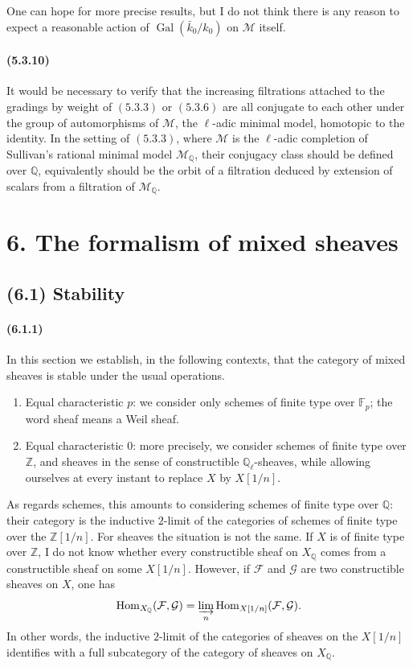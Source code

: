 \documentclass[11pt]{article}
\theoremstyle{remark}
\newcommand{\Ql}{\mathbb{Q}_\ell}
\newcommand{\ZZ}{\mathbb{Z}}
\newcommand{\QQ}{\mathbb{Q}}
\begin{document}
One can hope for more precise results, but I do not think there is any reason to expect a reasonable action of \(\operatorname{Gal}(\bar k_0/k_0)\) on \(\mathcal M\) itself.

\paragraph{(5.3.10)}
It would be necessary to verify that the increasing filtrations attached to the gradings by weight of \((5.3.3)\) or \((5.3.6)\) are all conjugate to each other under the group of automorphisms of \(\mathcal M\), the \(\ell\)-adic minimal model, homotopic to the identity.  In the setting of \((5.3.3)\), where \(\mathcal M\) is the \(\ell\)-adic completion of Sullivan's rational minimal model \(\mathcal M_{\QQ}\), their conjugacy class should be defined over \(\QQ\), equivalently should be the orbit of a filtration deduced by extension of scalars from a filtration of \(\mathcal M_{\QQ}\).



\section*{6. The formalism of mixed sheaves}

\subsection*{(6.1) Stability}

\paragraph{(6.1.1)}
In this section we establish, in the following contexts, that the category of mixed sheaves is stable under the usual operations.

\begin{enumerate}[label=\alph*)]
\item Equal characteristic \(p\): we consider only schemes of finite type over \(\mathbb F_p\); the word sheaf means a Weil sheaf.
\item Equal characteristic \(0\): more precisely, we consider schemes of finite type over \(\ZZ\), and sheaves in the sense of constructible \(\Ql\)-sheaves, while allowing ourselves at every instant to replace \(X\) by \(X[1/n]\).
\end{enumerate}

As regards schemes, this amounts to considering schemes of finite type over \(\QQ\): their category is the inductive \(2\)-limit of the categories of schemes of finite type over the \(\ZZ[1/n]\).  For sheaves the situation is not the same.  If \(X\) is of finite type over \(\ZZ\), I do not know whether every constructible sheaf on \(X_{\QQ}\) comes from a constructible sheaf on some \(X[1/n]\).  However, if \(\mathcal F\) and \(\mathcal G\) are two constructible sheaves on \(X\), one has
\[
\operatorname{Hom}_{X_{\QQ}}(\mathcal F,\mathcal G)
 =\varinjlim_n \operatorname{Hom}_{X[1/n]}(\mathcal F,\mathcal G).
\]
In other words, the inductive \(2\)-limit of the categories of sheaves on the \(X[1/n]\) identifies with a full subcategory of the category of sheaves on \(X_{\QQ}\).
\end{document}
